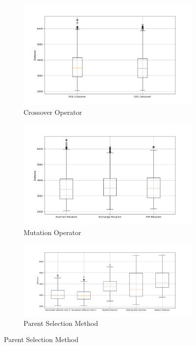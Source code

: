 \documentclass[11pt]{article}
\begin{document}
\begin{figure}[H]
    \centering
    \begin{subfigure}{0.3\textwidth}
        \includegraphics[width=\textwidth]{../results/crossover_method_boxplot.png}
        \caption{Crossover Operator}
        \label{fig:crossover}
    \end{subfigure}
    \begin{subfigure}{0.3\textwidth}
        \includegraphics[width=\textwidth]{../results/mutation_method_boxplot.png}
        \caption{Mutation Operator}
        \label{fig:mutation}
    \end{subfigure}
    \begin{subfigure}{0.3\textwidth}
        \includegraphics[width=\textwidth]{../results/parent_selection_method_boxplot.png}
        \caption{Parent Selection Method}
        \label{fig:parent_selection}
    \end{subfigure}
\end{figure}
\end{document}
